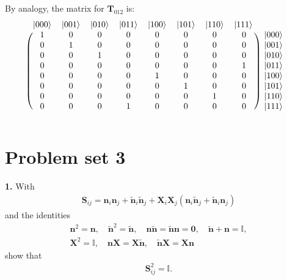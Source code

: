 \documentclass{book}
\theoremstyle{definition}
\newcommand{\nn}{\nonumber}
\newcommand{\n}{\mathbf{n}}
\newcommand{\X}{\mathbf{X}}
\newcommand{\Id}{\mathbb{I}}
\begin{document}
By analogy, the matrix for $\mathbf{T}_{012}$ is:
\begin{align}
\begin{blockarray}{ccccccccc}
\ket{000} & \ket{001} & \ket{010} & \ket{011} & \ket{100} & \ket{101}& \ket{110} & \ket{111} \\
\begin{block}{(cccccccc)c}
1 & 0 & 0 & 0 & 0 & 0 & 0 & 0 & \ket{000} \\
0 & 1 & 0 & 0 & 0 & 0 & 0 & 0 & \ket{001} \\
0 & 0 & 1 & 0 & 0 & 0 & 0 & 0 & \ket{010} \\
0 & 0 & 0 & 0 & 0 & 0 & 0 & 1 & \ket{011} \\
0 & 0 & 0 & 0 & 1 & 0 & 0 & 0 & \ket{100} \\
0 & 0 & 0 & 0 & 0 & 1 & 0 & 0 & \ket{101} \\
0 & 0 & 0 & 0 & 0 & 0 & 1 & 0 & \ket{110} \\
0 & 0 & 0 & 1 & 0 & 0 & 0 & 0 & \ket{111} \\
\end{block}
\end{blockarray}
\end{align}






\newpage



\section{Problem set 3}


\noindent \textbf{1.} With 
\begin{align}
\mathbf{S}_{ij} = \n_i\n_j + \tilde{\mathbf{\n}}_i \tilde{\mathbf{\n}}_j + \X_i\X_j(\n_i\tilde{\mathbf{n}}_j + \tilde{\mathbf{n}}_i \n_j)
\end{align}
and the identities
\begin{align}
\n^2 = \n, \quad \tilde{\n}^2 = \tilde{\mathbf{n}}, \quad \n\tilde{\n} = \tilde{\n}\n = \mathbf{0}, \quad \tilde{\n}+{\n} = \Id, \nn\\
\X^2 = \Id, \quad \n\X = \X \tilde{\n}, \quad \tilde{\n}\X = \X \n
\end{align}
show that 
\begin{align}
\mathbf{S}_{ij}^2 = \Id.
\end{align}
\end{document}
